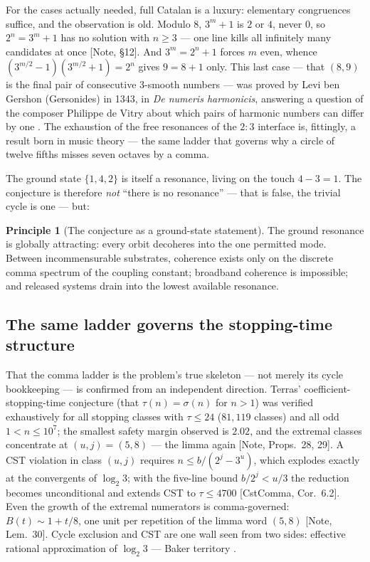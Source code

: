 \documentclass[11pt]{article}
\theoremstyle{definition}
\newtheorem{principle}[theorem]{Principle}
\theoremstyle{remark}
\newcommand{\anchor}[1]{\textup{[#1]}}
\begin{document}
For the cases actually needed, full Catalan is a luxury: elementary
congruences suffice, and the observation is old. Modulo $8$, $3^m + 1$ is
$2$ or $4$, never $0$, so $2^n = 3^m + 1$ has no solution with $n \geq 3$
--- one line kills all infinitely many candidates at once \anchor{Note,
\S12}. And $3^m = 2^n + 1$ forces $m$ even, whence
$(3^{m/2}-1)(3^{m/2}+1) = 2^n$ gives $9 = 8+1$ only. This last case --- that
$(8,9)$ is the final pair of consecutive $3$-smooth numbers --- was proved by
Levi ben Gershon (Gersonides) in 1343, in \emph{De numeris harmonicis},
answering a question of the composer Philippe de Vitry about which pairs of
harmonic numbers can differ by one \cite{Gersonides1343}. The exhaustion of
the free resonances of the $2{:}3$ interface is, fittingly, a result born in
music theory --- the same ladder that governs why a circle of twelve fifths
misses seven octaves by a comma.

The ground state $\{1,4,2\}$ is itself a resonance, living on the touch
$4 - 3 = 1$. The conjecture is therefore \emph{not} ``there is no resonance''
--- that is false, the trivial cycle is one --- but:

\begin{principle}[The conjecture as a ground-state statement]
The ground resonance is globally attracting: every orbit decoheres into the
one permitted mode. Between incommensurable substrates, coherence exists only
on the discrete comma spectrum of the coupling constant; broadband coherence
is impossible; and released systems drain into the lowest available
resonance.
\end{principle}

\subsection{The same ladder governs the stopping-time structure}

That the comma ladder is the problem's true skeleton --- not merely its cycle
bookkeeping --- is confirmed from an independent direction. Terras'
coefficient-stopping-time conjecture (that $\tau(n) = \sigma(n)$ for $n>1$)
was verified exhaustively for all stopping classes with $\tau \leq 24$
($81{,}119$ classes) and all odd $1 < n \leq 10^7$; the smallest safety margin
observed is $2.02$, and the extremal classes concentrate at
$(u,j) = (5,8)$ --- the limma again \anchor{Note, Props.~28, 29}. A CST
violation in class $(u,j)$ requires $n \leq b/(2^j - 3^u)$, which explodes
exactly at the convergents of $\log_2 3$; with the five-line bound
$b/2^j < u/3$ the reduction becomes unconditional and extends CST to
$\tau \leq 4700$ \anchor{CstComma, Cor.~6.2}. Even the growth of the extremal
numerators is comma-governed: $B(t) \sim 1 + t/8$, one unit per repetition of
the limma word $(5,8)$ \anchor{Note, Lem.~30}. Cycle exclusion and CST are
one wall seen from two sides: effective rational approximation of $\log_2 3$
--- Baker territory \cite{Baker1966, Rhin1987}.
\end{document}
